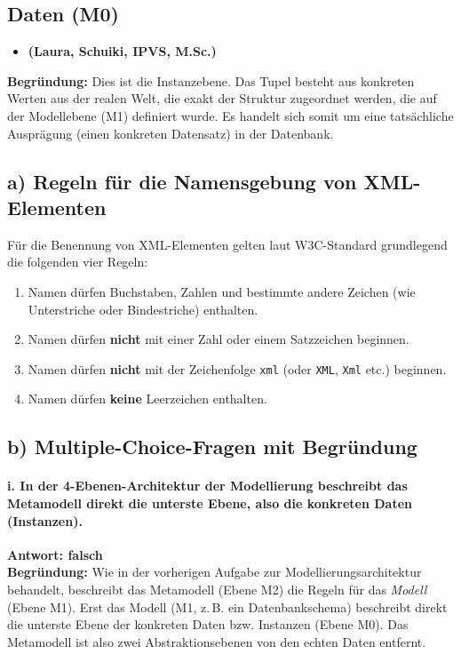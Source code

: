 \documentclass[12pt]{scrartcl}
\begin{document}
\subsection*{Daten (M0)}
\begin{itemize}
    \item \textbf{(Laura, Schuiki, IPVS, M.Sc.)}
\end{itemize}
\textbf{Begründung:} Dies ist die Instanzebene. Das Tupel besteht aus konkreten Werten aus der realen Welt, die exakt der Struktur zugeordnet werden, die auf der Modellebene (M1) definiert wurde. Es handelt sich somit um eine tatsächliche Ausprägung (einen konkreten Datensatz) in der Datenbank.

    \newpage


    \newpage



\subsection*{a) Regeln für die Namensgebung von XML-Elementen}
Für die Benennung von XML-Elementen gelten laut W3C-Standard grundlegend die folgenden vier Regeln:
\begin{enumerate}
    \item Namen dürfen Buchstaben, Zahlen und bestimmte andere Zeichen (wie Unterstriche oder Bindestriche) enthalten.
    \item Namen dürfen \textbf{nicht} mit einer Zahl oder einem Satzzeichen beginnen.
    \item Namen dürfen \textbf{nicht} mit der Zeichenfolge \texttt{xml} (oder \texttt{XML}, \texttt{Xml} etc.) beginnen.
    \item Namen dürfen \textbf{keine} Leerzeichen enthalten.
\end{enumerate}

\subsection*{b) Multiple-Choice-Fragen mit Begründung}

\paragraph*{i. In der 4-Ebenen-Architektur der Modellierung beschreibt das Metamodell direkt die unterste Ebene, also die konkreten Daten (Instanzen).}
\textbf{Antwort: falsch} \\
\textbf{Begründung:} Wie in der vorherigen Aufgabe zur Modellierungsarchitektur behandelt, beschreibt das Metamodell (Ebene M2) die Regeln für das \textit{Modell} (Ebene M1). Erst das Modell (M1, z.\,B. ein Datenbankschema) beschreibt direkt die unterste Ebene der konkreten Daten bzw. Instanzen (Ebene M0). Das Metamodell ist also zwei Abstraktionsebenen von den echten Daten entfernt.
\end{document}
